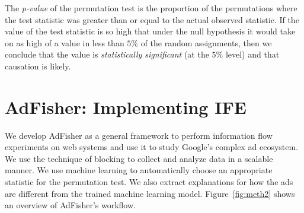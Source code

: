 \documentclass[10pt, onecolumn]{report}
\begin{document}
The \emph{p-value} of the permutation test is the proportion of the 
permutations where the test statistic was greater than or equal 
to the actual observed statistic.
If the value of the test statistic is so high that under the null 
hypothesis it would  take on as high of a value in less than $5\%$ 
of the random assignments, then we conclude that the value is 
\emph{statistically significant} (at the $5\%$ level) and that causation is likely.  %





\section{AdFisher: Implementing IFE}\label{sec:adfisher}

We develop AdFisher as a general framework to perform information flow experiments
on web systems and use it to study Google's complex ad ecosystem. 
We use the technique of blocking to collect and analyze data in a scalable manner.
We use machine learning to automatically choose an appropriate 
statistic for the permutation test. We also extract explanations for how the ads are 
different from the trained machine learning model. 
Figure~\ref{fig:meth2} shows an overview of AdFisher's workflow.
\end{document}
